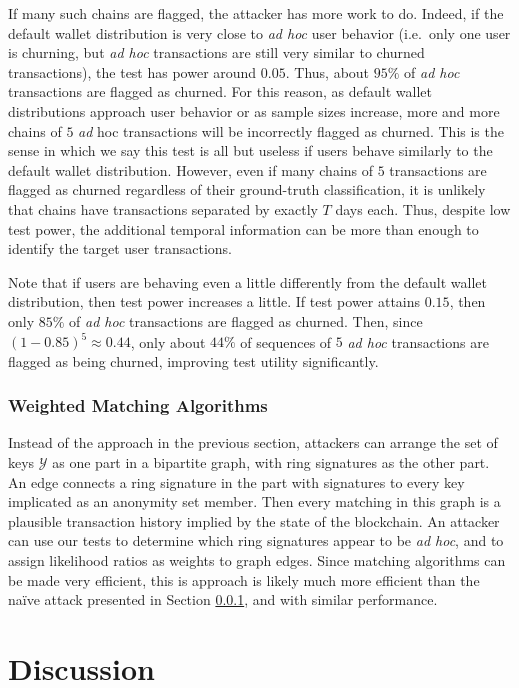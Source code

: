 \documentclass{tran-l}
\theoremstyle{cor}
\theoremstyle{definition}
\theoremstyle{remark}
\theoremstyle{conjecture}
\numberwithin{equation}{section}
\begin{document}
If many such chains are flagged, the attacker has more work to do. Indeed, if the default wallet distribution is very close to \textit{ad hoc} user behavior (i.e.\ only one user is churning, but \textit{ad hoc} transactions are still very similar to churned transactions), the test has power around $0.05$.
Thus, about $95\%$ of \textit{ad hoc} transactions are flagged as churned.
For this reason, as default wallet distributions approach user behavior or as sample sizes increase, more and more chains of $5$ \textit{ad} hoc transactions will be incorrectly flagged as churned.
This is the sense in which we say this test is all but useless if users behave similarly to the default wallet distribution.
However, even if many chains of $5$ transactions are flagged as churned regardless of their ground-truth classification, it is unlikely that chains have transactions separated by exactly $T$ days each.
Thus, despite low test power, the additional temporal information can be more than enough to identify the target user transactions.

Note that if users are behaving even a little differently from the default wallet distribution, then test power increases a little. If test power attains $0.15$, then only $85\%$ of \textit{ad hoc} transactions are flagged as churned. Then, since $(1-0.85)^5 \approx 0.44$, only about $44\%$ of sequences of $5$ \textit{ad hoc} transactions are flagged as being churned, improving test utility significantly.


\subsubsection{Weighted Matching Algorithms}

Instead of the approach in the previous section, attackers can arrange the set of keys $\mathcal{Y}$ as one part in a bipartite graph, with ring signatures as the other part.
An edge connects a ring signature in the part with signatures to every key implicated as an anonymity set member.
Then every matching in this graph is a plausible transaction history implied by the state of the blockchain.
An attacker can use our tests to determine which ring signatures appear to be \textit{ad hoc}, and to assign likelihood ratios as weights to graph edges.
Since matching algorithms can be made very efficient, this is approach is likely much more efficient than the na\"{i}ve attack presented in Section \ref{}, and with similar performance.

\section{Discussion}\label{sec:discussion}
\end{document}
